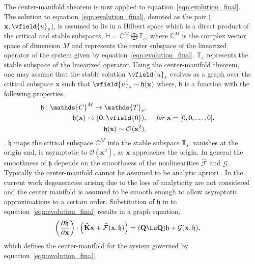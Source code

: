 The center-manifold theorem is now applied to equation~\eqref{eqn:evolution_final}. 	The solution to equation~\eqref{eqn:evolution_final}, denoted as the pair ($\mathbf{x},\vfield{u}_{s}$), is assumed to lie in a Hilbert space which is a direct product of the critical and stable subspaces, $\mathds{H} = \mathds{C}^{M} \bigoplus \mathds{T}_{s}$, where $\mathds{C}^{M}$ is the complex vector space of dimension $M$ and represents the center subspace of the linearized operator of the system given by equation~\eqref{eqn:evolution_final}. $\mathds{T}_{s}$ represents the stable subspace of the linearized operator. 
%
Using the center-manifold theorem, one may assume that the stable solution $\vfield{u}_{s}$ evolves as a graph over the critical subspace $\mathbf{x}$ such that $\vfield{u}_{s} \sim \mathfrak{h}(\mathbf{x})$ where, $\mathfrak{h}$ is a function with the following properties,
\begin{eqnarray}
	\label{eqn:CM_approx_properties}
	\mathfrak{h}: \mathds{C}^{M} \to \mathds{T}_{s}, & \nonumber \\
	\mathfrak{h}(\mathbf{x}) \mapsto (\boldsymbol{0},\vfield{0}), & \hspace{5mm} \textit{for}\ \mathbf{x} = [0,0,\ldots,0] , \nonumber \\
	\mathfrak{h}(\mathbf{x}) \sim \mathcal{O}(\mathbf{x}^{2}), & \nonumber
\end{eqnarray}
\ie, $\mathfrak{h}$ maps the critical subspace $\mathds{C}^{M}$ into the stable subspace $\mathds{T}_{s}$, vanishes at the origin and, is asymptotic to $\mathcal{O}(\mathbf{x}^{2})$, as $\mathbf{x}$ approaches the origin. 
In general the smoothness of $\mathfrak{h}$ depends on the smoothness of the nonlinearities $\mathcal{\widehat{F}}$ and $\mathcal{G}$. Typically the center-manifold cannot be assumed to be analytic apriori \citep{carr82,sijbrand85}. In the current work degeneracies arising due to the loss of analyticity are not considered and the center manifold is assumed to be smooth enough to allow asymptotic approximations to a certain order. Substitution of $\mathfrak{h}$ in to equation~\eqref{eqn:evolution_final} results in a graph equation,
\begin{align}
	\label{eqn:graph_equation}
	\left(\frac{\partial \mathfrak{h}}{\partial \mathbf{x}}\right)\cdot \left(\mathbf{\widehat{K}}\mathbf{x} + \mathcal{\widehat{F}}(\mathbf{x},\mathfrak{h}) \right) = (\mathbf{Q}\Lu\mathbf{Q})\mathfrak{h} + \mathcal{G}(\mathbf{x},\mathfrak{h}),
\end{align}
which defines the center-manifold for the system governed by equation~\eqref{eqn:evolution_final}. 

